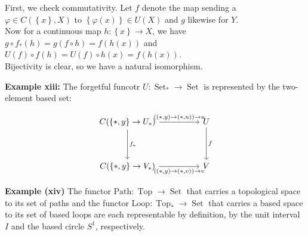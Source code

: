 \documentclass[a4paper]{article}
\DeclareMathOperator{\Set}{Set}
\DeclareMathOperator{\Top}{Top}
\begin{document}
First, we check commutativity. Let $f$ denote the map
sending a $\varphi \in C(\left\{ x \right\} ,X)$ to
$\left\{ \varphi(x) \right\} \in U(X)$ and
$g$ likewise for $Y$.\\
Now for a continuous map $h  \colon \left\{ x \right\} \to X$, we have
$g \circ f_* (h) = g \left( f \circ h \right) 
= f(h(x))$ and
$U(f) \circ f (h) = U(f) \circ h(x)
= f(h(x))$.\\
\linebreak
Bijectivity is clear, so we have a natural isomorphism.

\textbf{Example xiii:} The forgetful funcotr $U  \colon \Set_* \to \Set$ is
represented by the two-element based set:

\[\begin{tikzcd}
	{C(\{*,y\}\to U_*)} && U \\
	\\
	{C(\{*,y\}\to V_*)} && V
	\arrow["{f_*}", from=1-1, to=3-1]
	\arrow["f", from=1-3, to=3-3]
	\arrow["{((*,y)\to(*,u))\to u}", from=1-1, to=1-3]
	\arrow["{((*,y)\to(*,v))\to v}"', from=3-1, to=3-3]
\end{tikzcd}\]


\textbf{Example (xiv)} The functor $\text{Path}  \colon \Top \to \Set$ that
carries a topological space to its set of paths and the functor
$\text{Loop} \colon \Top_* \to \Set$ that carries a based space to its set of
based loops are each representable by definition, by the unit interval $I$ and
the based circle $S^{1}$, respectively.\\
\linebreak
\end{document}
